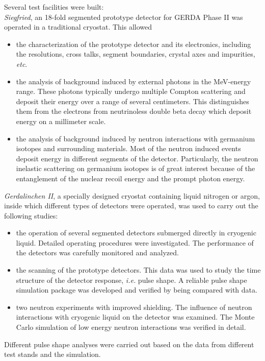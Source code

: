 Several test facilities were built:\\
\emph{Siegfried}, an 18-fold segmented prototype detector for GERDA
Phase II was operated in a traditional cryostat. This allowed
\begin{itemize}
\item the characterization of the prototype detector and its
  electronics, including the resolutions, cross talks, segment
  boundaries, crystal axes and impurities, \textit{etc}.
\item the analysis of background induced by external photons in the
  MeV-energy range. These photons typically undergo multiple Compton
  scattering and deposit their energy over a range of several
  centimeters. This distinguishes them from the electrons from
  neutrinoless double beta decay which deposit energy on a millimeter
  scale.
\item the analysis of background induced by neutron interactions with
  germanium isotopes and surrounding materials. Most of the neutron
  induced events deposit energy in different segments of the detector.
  Particularly, the neutron inelastic scattering on germanium isotopes
  is of great interest because of the entanglement of the nuclear
  recoil energy and the prompt photon energy.
\end{itemize}
\emph{Gerdalinchen II}, a specially designed cryostat containing
liquid nitrogen or argon, inside which different types of detectors
were operated, was used to carry out the following studies:
\begin{itemize}
\item the operation of several segmented detectors submerged directly
  in cryogenic liquid. Detailed operating procedures were
  investigated. The performance of the detectors was carefully
  monitored and analyzed.
\item the scanning of the prototype detectors. This data was used to
  study the time structure of the detector response, \textit{i.e.}
  pulse shape. A reliable pulse shape simulation package was developed
  and verified by being compared with data.
\item two neutron experiments with improved shielding. The influence
  of neutron interactions with cryogenic liquid on the detector was
  examined. The Monte Carlo simulation of low energy neutron
  interactions was verified in detail.
\end{itemize}
Different pulse shape analyses were carried out based on the data from
different test stands and the simulation.


